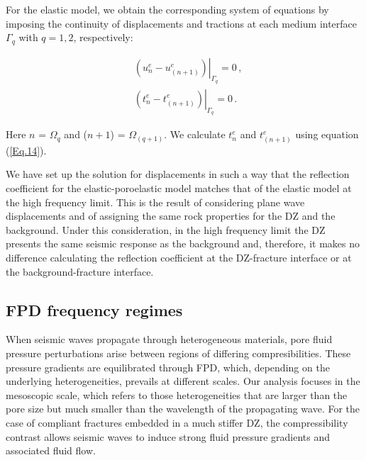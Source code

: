 \documentclass[draft]{agujournal2019}
\begin{document}
For the elastic model, we obtain the corresponding system of equations by imposing the continuity of displacements and tractions  at each medium interface $\Gamma_q$ with $q=1,2$, respectively:
\begin{linenomath*}
\begin{equation}\label{Eq.18}
\begin{split}
&  \left. \left(  u_n^e -  u_{(n+1)}^e \right) \right \rvert_{\Gamma_q} = 0 \,, \\
&  \left. \left( t_n^e  - t_{(n+1)}^e  \right) \right \rvert_{\Gamma_q} = 0 \,.
\end{split}
\end{equation}
\end{linenomath*}
Here $n$ = $\Omega_q$ and ($n+1$) = $\Omega_{(q+1)}$. We calculate $t_n^e$  and $t_{(n+1)}^e$ using equation (\ref{Eq.14}).

 
 We have set up the solution for displacements  in such a way that the reflection coefficient for the elastic-poroelastic model matches that of the elastic model at the high frequency limit. This is the result of considering plane wave displacements and of assigning the same rock properties for the DZ and the background. Under this consideration, in the high frequency limit the DZ presents the same seismic response as the background and, therefore, it  makes no difference calculating the reflection coefficient at the DZ-fracture interface or at the background-fracture interface.

\subsection{FPD frequency regimes}
When seismic waves propagate through heterogeneous materials, pore fluid pressure perturbations arise between regions of differing compresibilities. These pressure gradients are equilibrated through FPD, which, depending on the underlying heterogeneities, prevails at different scales. Our analysis focuses in the mesoscopic scale, which refers to those heterogeneities that are larger than the pore size but much smaller than the wavelength of the propagating wave. For the case of compliant fractures embedded in a much stiffer DZ, the compressi\-bility contrast allows seismic waves to induce strong fluid pressure gradients and  associated fluid flow.
\end{document}
